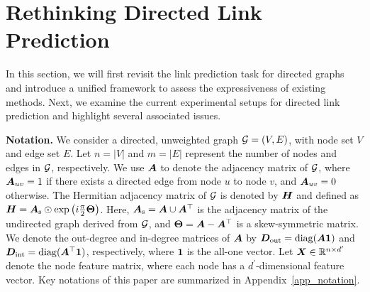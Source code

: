 

\section{Rethinking Directed Link Prediction}
In this section, we will first revisit the link prediction task for directed graphs and introduce a unified framework to assess the expressiveness of existing methods. Next, we examine the current experimental setups for directed link prediction and highlight several associated issues.

\textbf{Notation.} We consider a directed, unweighted graph ${\mathcal{G}} = (V, E)$, with node set $V$ and edge set $E$. Let $n = |V|$ and $m = |E|$ represent the number of nodes and edges in ${\mathcal{G}}$, respectively. We use ${\bm{A}}$ to denote the adjacency matrix of ${\mathcal{G}}$, where ${\bm{A}}_{uv} = 1$ if there exists a directed edge from node $u$ to node $v$, and ${\bm{A}}_{uv} = 0$ otherwise.
The Hermitian adjacency matrix of ${\mathcal{G}}$ is denoted by ${\bm{H}}$ and defined as ${\bm{H}} = {\bm{A}}_{\rm s} \odot \exp\left(i\frac{\pi}{2}\mathbf{\Theta}\right)$. Here, ${\bm{A}}_{\rm s} = {\bm{A}} \cup {\bm{A}}^{\top}$ is the adjacency matrix of the undirected graph derived from ${\mathcal{G}}$, and $\mathbf{\Theta} = {\bm{A}} - {\bm{A}}^{\top}$ is a skew-symmetric matrix.
We denote the out-degree and in-degree matrices of ${\bm{A}}$ by ${\bm{D}}_{\rm out} = {\rm diag}({\bm{A}}{\bm{1}})$ and ${\bm{D}}_{\rm int} = {\rm diag}({\bm{A}}^{\top}{\bm{1}})$, respectively, where ${\bm{1}}$ is the all-one vector. Let ${\bm{X}} \in \mathbb{R}^{n \times d^{\prime}}$ denote the node feature matrix, where each node has a $d^{\prime}$-dimensional feature vector. Key notations of this paper are summarized in Appendix~\ref{app_notation}.




